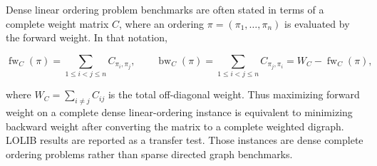 Dense linear ordering problem benchmarks are often stated in terms of a complete weight matrix \(C\), where an ordering \(\pi=(\pi_1,\ldots,\pi_n)\) is evaluated by the forward weight. In that notation,

\begin{equation}
    \operatorname{fw}_{C}(\pi)
    =
    \sum_{1\le i<j\le n} C_{\pi_i,\pi_j},
    \qquad
    \operatorname{bw}_{C}(\pi)
    =
    \sum_{1\le i<j\le n} C_{\pi_j,\pi_i}
    =
    W_C-\operatorname{fw}_{C}(\pi),
    \label{eq:lolib-forward-backward}
\end{equation}

where \(W_C=\sum_{i\ne j}C_{ij}\) is the total off-diagonal weight. Thus maximizing forward weight on a complete dense linear-ordering instance is equivalent to minimizing backward weight after converting the matrix to a complete weighted digraph. LOLIB results are reported as a transfer test. Those instances are dense complete ordering problems rather than sparse directed graph benchmarks.
